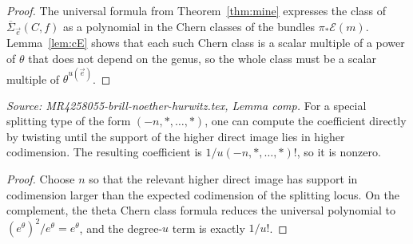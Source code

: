 \begin{proof}
  The universal formula from Theorem~\ref{thm:mine} expresses the class of \(\overline{\Sigma}_{\vec e}(C,f)\) as a polynomial in the Chern classes of the bundles \(\pi_*\mathcal E(m)\). Lemma~\ref{lem:cE} shows that each such Chern class is a scalar multiple of a power of \(\theta\) that does not depend on the genus, so the whole class must be a scalar multiple of \(\theta^{u(\vec e)}\).
\end{proof}

\begin{lemma}
  \label{lem:comp}
  \textit{Source: MR4258055-brill-noether-hurwitz.tex, Lemma comp.}
  For a special splitting type of the form \((-n,*,\ldots,*)\), one can compute the coefficient directly by twisting until the support of the higher direct image lies in higher codimension. The resulting coefficient is \(1/u(-n,*,\ldots,*)!\), so it is nonzero.
\end{lemma}

\begin{proof}
  Choose \(n\) so that the relevant higher direct image has support in codimension larger than the expected codimension of the splitting locus. On the complement, the theta Chern class formula reduces the universal polynomial to \((e^\theta)^2/e^\theta=e^\theta\), and the degree-\(u\) term is exactly \(1/u!\).
\end{proof}
